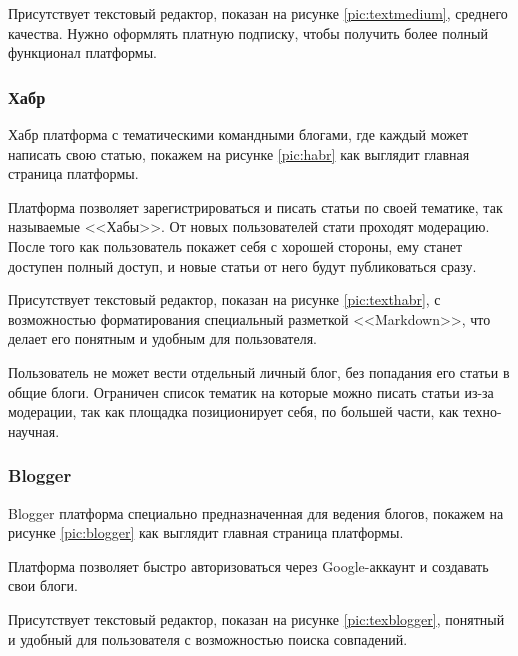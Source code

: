 
Присутствует текстовый редактор, показан на рисунке \ref{pic:textmedium}, среднего качества. Нужно оформлять платную подписку, чтобы получить более полный функционал платформы.


\subsubsection{Хабр}

Хабр платформа с тематическими командными блогами, где каждый может написать свою статью, покажем на рисунке \ref{pic:habr} как выглядит главная страница платформы.


Платформа позволяет зарегистрироваться и писать статьи по своей тематике, так называемые <<Хабы>>. От новых пользователей стати проходят модерацию. После того как пользователь покажет себя с хорошей стороны, ему станет доступен полный доступ, и новые статьи от него будут публиковаться сразу.

\pagebreak

Присутствует текстовый редактор, показан на рисунке \ref{pic:texthabr}, с возможностью форматирования специальный разметкой <<Markdown>>, что делает его понятным и удобным для пользователя.


Пользователь не может вести отдельный личный блог, без попадания его статьи в общие блоги. Ограничен список тематик на которые можно писать статьи из-за модерации, так как площадка позиционирует себя, по большей части, как техно-научная.

\pagebreak

\subsubsection{Blogger}

Blogger платформа специально предназначенная для ведения блогов, покажем на рисунке \ref{pic:blogger} как выглядит главная страница платформы.


Платформа позволяет быстро авторизоваться через Google-аккаунт и создавать свои блоги.

Присутствует текстовый редактор, показан на рисунке \ref{pic:texblogger}, понятный и удобный для пользователя с возможностью поиска совпадений.


\pagebreak